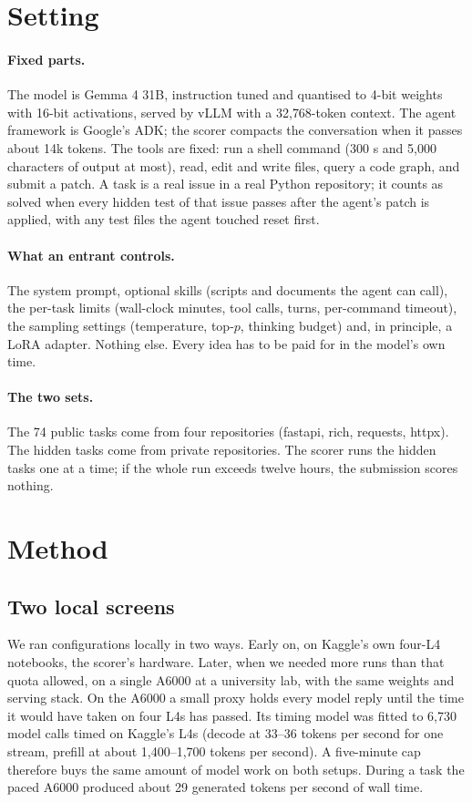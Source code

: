 \documentclass[11pt]{article}
\begin{document}
\section{Setting}
\label{sec:setting}

\paragraph{Fixed parts.} The model is Gemma 4 31B, instruction tuned and quantised to 4-bit weights with 16-bit activations,
served by vLLM with a 32{,}768-token context. The agent framework is Google's ADK; the scorer compacts the conversation when it
passes about 14k tokens. The tools are fixed: run a shell command (300 s and 5{,}000 characters of output at most), read,
edit and write files, query a code graph, and submit a patch. A task is a real issue in a real Python repository; it counts
as solved when every hidden test of that issue passes after the agent's patch is applied, with any test files the agent
touched reset first.

\paragraph{What an entrant controls.} The system prompt, optional skills (scripts and documents the agent can call), the
per-task limits (wall-clock minutes, tool calls, turns, per-command timeout), the sampling settings (temperature, top-$p$,
thinking budget) and, in principle, a LoRA adapter. Nothing else. Every idea has to be paid for in the model's own time.

\paragraph{The two sets.} The 74 public tasks come from four repositories (fastapi, rich, requests, httpx). The hidden
tasks come from private repositories. The scorer runs the hidden tasks one at a time; if the whole run exceeds twelve hours,
the submission scores nothing.

\section{Method}
\label{sec:method}

\subsection{Two local screens}
We ran configurations locally in two ways. Early on, on Kaggle's own four-L4 notebooks, the scorer's hardware. Later, when
we needed more runs than that quota allowed, on a single A6000 at a university lab, with the same weights and serving stack.
On the A6000 a small proxy holds every model reply until the time it would have taken on four L4s has passed. Its timing
model was fitted to 6{,}730 model calls timed on Kaggle's L4s (decode at 33--36 tokens per second for one stream, prefill
at about 1{,}400--1{,}700 tokens per second). A five-minute cap therefore buys the same amount of model work on both setups.
During a task the paced A6000 produced about 29 generated tokens per second of wall time.
\end{document}
